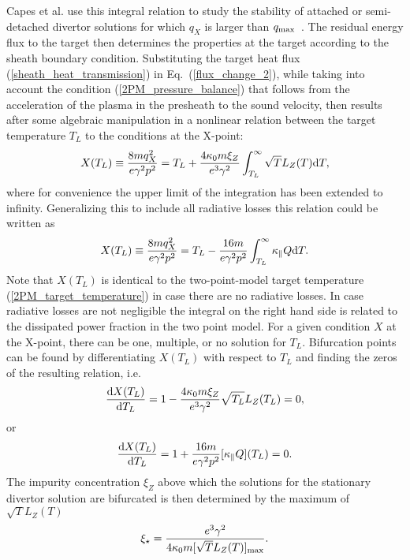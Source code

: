 \documentclass[amsmath,amssymb,a4]{revtex4-2}
\begin{document}
{Capes et al. use this integral relation to study the stability of attached or semi-detached divertor solutions for which $q_X$ is larger than $q_{\rm max}$~\cite{capes1992}. The residual energy flux to the target then determines the properties at the target according to the sheath boundary condition. Substituting the target heat flux (\ref{sheath_heat_transmission}) in Eq.~(\ref{flux_change_2}), while taking into account the condition (\ref{2PM_pressure_balance}) that follows from the acceleration of the plasma in the presheath to the sound velocity, then results after some algebraic manipulation in a nonlinear relation between the target temperature $T_L$ to the conditions at the X-point:
\begin{equation}
    X(T_L) \equiv {8 m q_X^2 \over e \gamma^2 p^2} = T_L + {4 \kappa_0 m \xi_Z \over e^3 \gamma^2} \int_{T_L}^\infty \sqrt{T} L_Z(T) {\rm d}T,
\end{equation}
where for convenience the upper limit of the integration has been extended to infinity. Generalizing this to include all radiative losses this relation could be written as
\begin{equation}
    X(T_L) \equiv {8 m q_X^2 \over e \gamma^2 p^2} = T_L - {16 m \over e \gamma^2 p^2}  \int_{T_L}^\infty \kappa_\parallel Q {\rm d}T.
\end{equation}
Note that $X(T_L)$ is identical to the two-point-model target temperature (\ref{2PM_target_temperature}) in case there are no radiative losses. In case radiative losses are not negligible the integral on the right hand side is related to the dissipated power fraction in the two point model. For a given condition $X$ at the X-point, there can be one, multiple, or no solution for $T_L$. Bifurcation points can be found by differentiating $X(T_L)$ with respect to $T_L$ and finding the zeros of the resulting relation, i.e.
\begin{equation}
    {{\rm d} X(T_L) \over {\rm d}T_L} = 1 - {4 \kappa_0 m \xi_Z \over e^3 \gamma^2} \sqrt{T_L} L_Z(T_L) = 0,
\end{equation}
or
\begin{equation}
    {{\rm d} X(T_L) \over {\rm d}T_L} = 1 + {16 m \over e \gamma^2 p^2} [\kappa_\parallel Q](T_L) = 0.
\end{equation}
The impurity concentration $\xi_Z$ above which the solutions for the stationary divertor solution are bifurcated is then determined by the maximum of $\sqrt{T} L_Z(T)$
\begin{equation}
    \xi_\star = {e^3 \gamma^2 \over 4 \kappa_0 m [\sqrt{T} L_Z(T)]_{\rm max}}.

\end{equation}}
\end{document}
